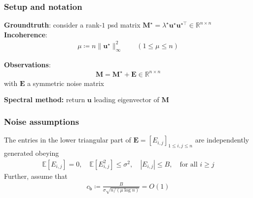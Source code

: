 \documentclass[compress,
mathserif,wide,%
]{beamer}
\begin{document}
%
\begin{frame}
	\frametitle{Setup and notation}
	{\bf Groundtruth}: consider a rank-$1$ psd matrix $\bm{M}^{\star} = \lambda^{\star} \bm{u}^{\star} \bm{u}^{\star\top}\in \mathbb{R}^{n\times n}$   \\
	
	\vspace{1em}
	{\bf Incoherence}: 
	\begin{align*}
	\mu \coloneqq {n\|\bm{u}^{\star}\|_{\infty}^{2}} \qquad (1 \leq \mu \leq n)
\end{align*}

	\vspace{1em}
	{\bf Observations}: 
	\begin{align*}
	\bm{M}=\bm{M}^{\star}+\bm{E} \in \mathbb{R}^{n\times n}
\end{align*}
with $\bm{E}$ a symmetric noise matrix

	\vspace{1em}
	{\bf Spectral method:} return $\bm{u}$ leading eigenvector of $\bm{M}$
\end{frame}


\begin{frame}
	\frametitle{Noise assumptions}


	The entries in the lower triangular part of $\bm{E}=[E_{i,j}]_{1\leq i,j\leq n}$ are independently generated obeying
%
\begin{align*}
	\mathbb{E}[E_{i,j}] = 0, \quad \mathbb{E}[E_{i,j}^2]\leq \sigma^2, \quad |E_{i,j}|\leq B, \quad \text{for all }i\geq j
\end{align*}
%
	Further,  assume that 
	\begin{align*}
		c_{\mathsf{b}} \coloneqq \frac{B}{  \sigma  \sqrt{n/(\mu\log n)} } = O(1)
	\end{align*}
	
\end{frame}
\end{document}
